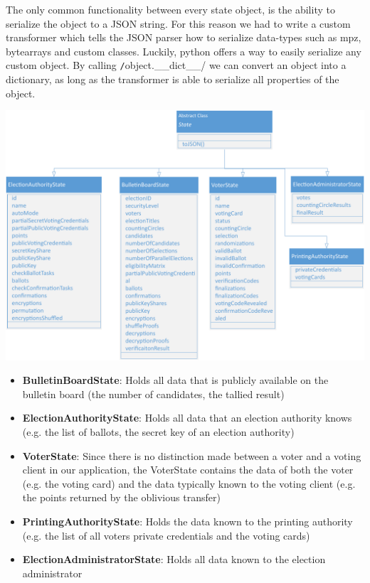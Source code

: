 The only common functionality between every state object, is the ability to serialize the object to a JSON string. For this reason we had to write a custom transformer which tells the JSON parser how to serialize data-types such as mpz, bytearrays and custom classes. Luckily, python offers a way to easily serialize any custom object. By calling \texttt/object.__dict__/ we can convert an object into a dictionary, as long as the transformer is able to serialize all properties of the object.
\begin{center}
\includegraphics[scale=0.60]{assets/uml_states.pdf}
\label{State classes}%
\end{center}

\begin{itemize}
	\item \textbf{BulletinBoardState}: Holds all data that is publicly available on the bulletin board (the number of candidates, the tallied result)
	\item \textbf{ElectionAuthorityState}: Holds all data that an election authority knows (e.g. the list of ballots, the secret key of an election authority)
	\item \textbf{VoterState}: Since there is no distinction made between a voter and a voting client in our application, the VoterState contains the data of both the voter (e.g. the voting card) and the data typically known to the voting client (e.g. the points returned by the oblivious transfer)
	\item \textbf{PrintingAuthorityState}: Holds the data known to the printing authority (e.g. the list of all voters private credentials and the voting cards)
	\item \textbf{ElectionAdministratorState}: Holds all data known to the election administrator 
\end{itemize}

